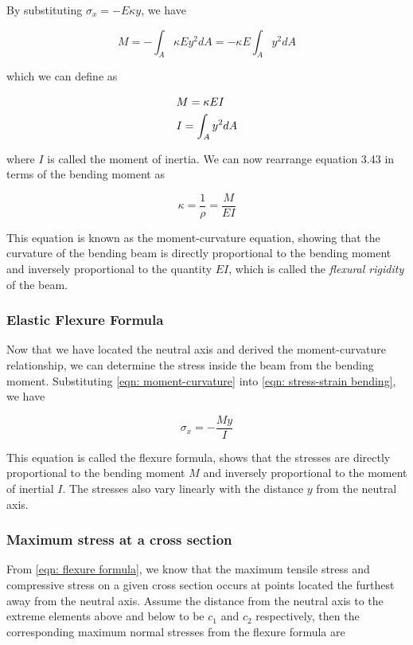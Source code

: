 \documentclass[a4paper,openany,nobib]{tufte-book}
\begin{document}
By substituting \(\sigma_x = -E\kappa y\), we have

$$M =  - \int_A \kappa Ey^2dA  =  - \kappa E\int_A y^2dA$$

which we can define as

$$\begin{gathered}
  M = \kappa EI \hfill \\
  I = \int_A y^2dA  \hfill \\ 
\end{gathered}$$

where \(I\) is called the moment of inertia. We can now rearrange equation
3.43 in terms of the bending moment as

$$ \kappa  = \frac{1}{\rho } = \frac{M}{EI}$$

This equation is known as the moment-curvature equation, showing that
the curvature of the bending beam is directly proportional to the
bending moment and inversely proportional to the quantity \(EI\), which is
called the \emph{flexural rigidity} of the beam.

\subsubsection{Elastic Flexure Formula}
\label{elastic-flexure-formula}
Now that we have located the neutral axis and derived the
moment-curvature relationship, we can determine the stress inside the
beam from the bending moment. Substituting
\ref{eqn: moment-curvature} into
\ref{eqn: stress-strain bending}, we have

$$ \sigma_x =  - \frac{My}{I}$$

This equation is called the flexure formula, shows that the stresses are
directly proportional to the bending moment \(M\) and inversely
proportional to the moment of inertial \(I\). The stresses also vary
linearly with the distance \(y\) from the neutral axis.

\subsubsection{Maximum stress at a cross section}
\label{maximum-stress-at-a-cross-section}
From \ref{eqn: flexure formula}, we know that the
maximum tensile stress and compressive stress on a given cross section
occurs at points located the furthest away from the neutral axis. Assume
the distance from the neutral axis to the extreme elements above and
below to be \(c_1\) and \(c_2\) respectively, then the corresponding maximum
normal stresses from the flexure formula are
\end{document}
